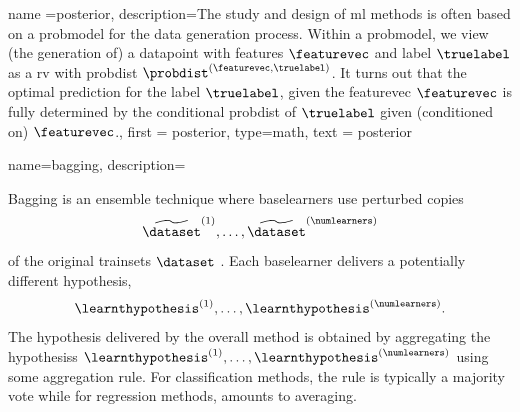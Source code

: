 {name ={posterior}, 
 description={The study and design of \gls{ml} methods is often based on a 
              \gls{probmodel} for the \gls{data} generation process. Within a 
			  \gls{probmodel}, we view (the generation of) a \gls{datapoint} with 
			  \glspl{feature} $\featurevec$ and \gls{label} $\truelabel$ as a 
			  \gls{rv} with \gls{probdist} $\probdist^{(\featurevec,\truelabel)}$. 
			  It turns out that the optimal \gls{prediction} for the \gls{label} 
			  $\truelabel$, given the \gls{featurevec} $\featurevec$ is fully 
			  determined by the conditional \gls{probdist} 
			  of $\truelabel$ given (conditioned on) $\featurevec$.}, 
 first = {posterior}, 
 type=math, 
 text = {posterior} 
}


{name={bagging},
	description={
		Bagging is an \gls{ensemble} technique where \glspl{baselearner} 
		use perturbed copies $$\widetilde{\dataset}^{(1)},\ldots,\widetilde{\dataset}^{(\numlearners)}$$ 
		of the original \glspl{trainset} $\dataset$ \cite{Breiman:1996aa}. Each 
		\gls{baselearner} delivers a potentially different \gls{hypothesis}, $$\learnthypothesis^{(1)},\ldots,\learnthypothesis^{(\numlearners)}.$$
		The \gls{hypothesis} delivered by the overall method is obtained by 
		aggregating the \glspl{hypothesis} $\learnthypothesis^{(1)},\ldots,\learnthypothesis^{(\numlearners)}$ 
		using some aggregation rule. For \gls{classification} methods, the rule is typically 
		a majority vote while for \gls{regression} methods, amounts to averaging. 
		\begin{figure}[htbp]
		\begin{center}
\end{center}
\end{figure}}}
